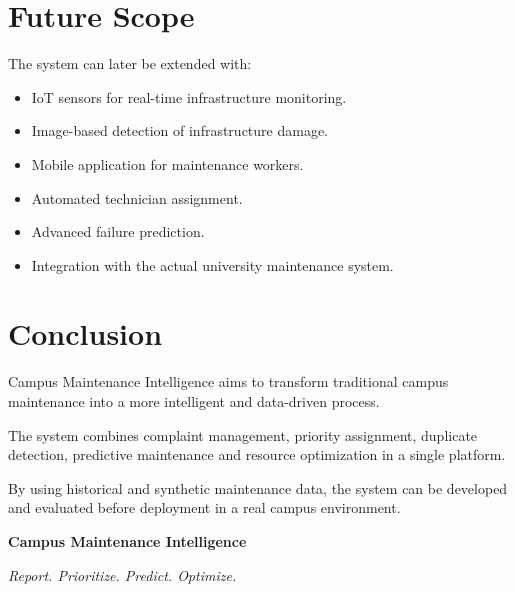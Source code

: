 \documentclass[12pt,a4paper]{article}
\begin{document}

\section{Future Scope}

The system can later be extended with:

\begin{itemize}
    \item IoT sensors for real-time infrastructure monitoring.
    \item Image-based detection of infrastructure damage.
    \item Mobile application for maintenance workers.
    \item Automated technician assignment.
    \item Advanced failure prediction.
    \item Integration with the actual university maintenance system.
\end{itemize}



\section{Conclusion}

Campus Maintenance Intelligence aims to transform traditional campus maintenance into a more intelligent and data-driven process.

The system combines complaint management, priority assignment, duplicate detection, predictive maintenance and resource optimization in a single platform.

By using historical and synthetic maintenance data, the system can be developed and evaluated before deployment in a real campus environment.

\begin{center}

\vspace{0.5cm}

\textbf{Campus Maintenance Intelligence}

\textit{Report. Prioritize. Predict. Optimize.}

\end{center}
\end{document}
